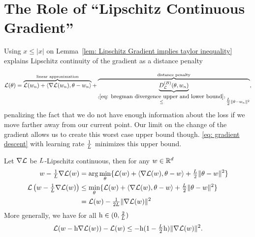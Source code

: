 \section{The Role of ``Lipschitz Continuous Gradient''}

Using \(x\le|x|\) on Lemma~\ref{lem: Lipschitz Gradient implies taylor inequality}
explains Lipschitz continuity of the gradient as a distance penalty

\begin{align}\label{eq: lin approx + distance penalty notion}
	\Loss(\theta)
	= \overbrace{
		\Loss(\weights_n)+ \langle\nabla\Loss(\weights_n), \theta-\weights_n\rangle 
	}^{\text{linear approximation}}
	+ \overbrace{\underbrace{\bregmanDiv{\Loss}(\theta,\weights_n)}_{
		\xle{(\ref{eq: bregman divergence upper and lower bound})}
		\tfrac\ubound{2} \|\theta-\weights_n\|^2 
	}}^{\text{distance penalty}},
\end{align}
%
penalizing the fact that we do not have enough information about the loss if we
move farther away from our current point. Our limit on the change of the gradient
allows us to create this worst case upper bound though.
\ref{eq: gradient descent} with learning rate \(\frac1{L}\) minimizes this upper bound.
%
\begin{lemma}
	\label{lem: smallest upper bound}
	Let \(\nabla \mathcal{L}\) be \(L\)-Lipschitz continuous, then for any \(w\in\mathbb{R}^d\)
	\begin{align}
		w - \tfrac{1}{L}\nabla \mathcal{L}(w) 
		&= \arg\min_{\theta}\{
			\mathcal{L}(w)+ \langle\nabla \mathcal{L}(w), \theta-w\rangle + \tfrac{L}{2}\|\theta-w\|^2 
		\}\\
		\label{eq: min approximation}
		\mathcal{L}\left(w-\tfrac{1}{L}\nabla\mathcal{L}(w)\right)
		&\le \min_{\theta} \{
			\mathcal{L}(w)+ \langle\nabla \mathcal{L}(w), \theta-w\rangle
			+ \tfrac{L}{2}\|\theta-w\|^2 
		\} \\ \nonumber
		&= \mathcal{L}(w) - \tfrac{1}{2L} \|\nabla \mathcal{L}(w)\|^2
	\end{align}
	More generally, we have for all \(\text{h}\in(0, \tfrac{2}{L})\)
	\begin{align*}
		\mathcal{L}(w - \text{h}\nabla\mathcal{L}(w)) - \mathcal{L}(w)
		\le-\text{h}(1-\tfrac{L}2 \text{h})\|\nabla\mathcal{L}(w)\|^2.
	\end{align*}
\end{lemma}
